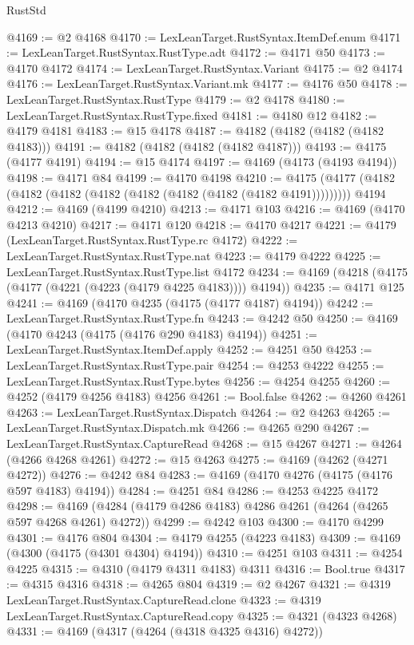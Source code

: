 \begin{lexlean}{RustStd}
\begin{coremodule}
@4169 := @2 @4168
@4170 := LexLeanTarget.RustSyntax.ItemDef.enum
@4171 := LexLeanTarget.RustSyntax.RustType.adt
@4172 := @4171 @50
@4173 := @4170 @4172
@4174 := LexLeanTarget.RustSyntax.Variant
@4175 := @2 @4174
@4176 := LexLeanTarget.RustSyntax.Variant.mk
@4177 := @4176 @50
@4178 := LexLeanTarget.RustSyntax.RustType
@4179 := @2 @4178
@4180 := LexLeanTarget.RustSyntax.RustType.fixed
@4181 := @4180 @12
@4182 := @4179 @4181
@4183 := @15 @4178
@4187 := @4182 (@4182 (@4182 (@4182 @4183)))
@4191 := @4182 (@4182 (@4182 (@4182 @4187)))
@4193 := @4175 (@4177 @4191)
@4194 := @15 @4174
@4197 := @4169 (@4173 (@4193 @4194))
@4198 := @4171 @84
@4199 := @4170 @4198
@4210 := @4175 (@4177 (@4182 (@4182 (@4182 (@4182 (@4182 (@4182 (@4182 (@4182 @4191))))))))) @4194
@4212 := @4169 (@4199 @4210)
@4213 := @4171 @103
@4216 := @4169 (@4170 @4213 @4210)
@4217 := @4171 @120
@4218 := @4170 @4217
@4221 := @4179 (LexLeanTarget.RustSyntax.RustType.rc @4172)
@4222 := LexLeanTarget.RustSyntax.RustType.nat
@4223 := @4179 @4222
@4225 := LexLeanTarget.RustSyntax.RustType.list @4172
@4234 := @4169 (@4218 (@4175 (@4177 (@4221 (@4223 (@4179 @4225 @4183)))) @4194))
@4235 := @4171 @125
@4241 := @4169 (@4170 @4235 (@4175 (@4177 @4187) @4194))
@4242 := LexLeanTarget.RustSyntax.RustType.fn
@4243 := @4242 @50
@4250 := @4169 (@4170 @4243 (@4175 (@4176 @290 @4183) @4194))
@4251 := LexLeanTarget.RustSyntax.ItemDef.apply
@4252 := @4251 @50
@4253 := LexLeanTarget.RustSyntax.RustType.pair
@4254 := @4253 @4222
@4255 := LexLeanTarget.RustSyntax.RustType.bytes
@4256 := @4254 @4255
@4260 := @4252 (@4179 @4256 @4183) @4256
@4261 := Bool.false
@4262 := @4260 @4261
@4263 := LexLeanTarget.RustSyntax.Dispatch
@4264 := @2 @4263
@4265 := LexLeanTarget.RustSyntax.Dispatch.mk
@4266 := @4265 @290
@4267 := LexLeanTarget.RustSyntax.CaptureRead
@4268 := @15 @4267
@4271 := @4264 (@4266 @4268 @4261)
@4272 := @15 @4263
@4275 := @4169 (@4262 (@4271 @4272))
@4276 := @4242 @84
@4283 := @4169 (@4170 @4276 (@4175 (@4176 @597 @4183) @4194))
@4284 := @4251 @84
@4286 := @4253 @4225 @4172
@4298 := @4169 (@4284 (@4179 @4286 @4183) @4286 @4261 (@4264 (@4265 @597 @4268 @4261) @4272))
@4299 := @4242 @103
@4300 := @4170 @4299
@4301 := @4176 @804
@4304 := @4179 @4255 (@4223 @4183)
@4309 := @4169 (@4300 (@4175 (@4301 @4304) @4194))
@4310 := @4251 @103
@4311 := @4254 @4225
@4315 := @4310 (@4179 @4311 @4183) @4311
@4316 := Bool.true
@4317 := @4315 @4316
@4318 := @4265 @804
@4319 := @2 @4267
@4321 := @4319 LexLeanTarget.RustSyntax.CaptureRead.clone
@4323 := @4319 LexLeanTarget.RustSyntax.CaptureRead.copy
@4325 := @4321 (@4323 @4268)
@4331 := @4169 (@4317 (@4264 (@4318 @4325 @4316) @4272))

\end{coremodule}
\end{lexlean}
